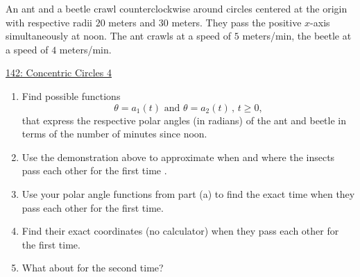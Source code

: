 \documentclass{ximera}
\begin{document}
\begin{question} \label{Q43fg4tggfr}
An ant and a beetle crawl counterclockwise around circles centered at the origin with respective radii $20$ meters and $30$ meters.  They pass the positive $x$-axis simultaneously at noon.  The ant crawls at a speed of $5$ meters/min, the beetle at a speed of $4$ meters/min. 

\begin{onlineOnly}
    \begin{center}
\end{center}
\end{onlineOnly}

\href{https://www.desmos.com/calculator/ie75j2a9ky}{142: Concentric Circles 4}

\begin{enumerate}

\item Find possible functions
\[
   \theta = a_1(t) \text{ and } \theta = a_2(t) \, , \, t\geq 0 ,
\]
that express the respective polar angles (in radians) of the ant and beetle in terms of the number of minutes since noon.

\item Use the demonstration above to approximate when and where the insects pass each other for the first time .

\item Use your polar angle functions from part (a) to find the exact time when they pass each other for the first time.


\item Find their exact coordinates (no calculator) when they pass each other for the first time.

\item What about for the second time?
\end{enumerate}
\end{question}
\end{document}
